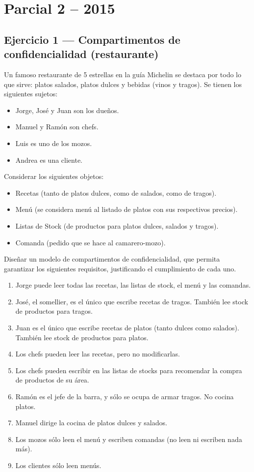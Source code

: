 \section{Parcial 2 -- 2015}

\subsection{Ejercicio 1 — Compartimentos de confidencialidad (restaurante)}

\begin{consigna}
Un famoso restaurante de 5 estrellas en la guía Michelin se destaca por todo lo que sirve: platos salados, platos dulces y bebidas (vinos y tragos). Se tienen los siguientes sujetos:
\begin{itemize}
  \item Jorge, José y Juan son los dueños.
  \item Manuel y Ramón son chefs.
  \item Luis es uno de los mozos.
  \item Andrea es una cliente.
\end{itemize}
Considerar los siguientes objetos:
\begin{itemize}
  \item Recetas (tanto de platos dulces, como de salados, como de tragos).
  \item Menú (se considera menú al listado de platos con sus respectivos precios).
  \item Listas de Stock (de productos para platos dulces, salados y tragos).
  \item Comanda (pedido que se hace al camarero-mozo).
\end{itemize}
Diseñar un modelo de compartimentos de confidencialidad, que permita garantizar los siguientes requisitos, justificando el cumplimiento de cada uno.
\begin{enumerate}
  \item Jorge puede leer todas las recetas, las listas de stock, el menú y las comandas.
  \item José, el somellier, es el único que escribe recetas de tragos. También lee stock de productos para tragos.
  \item Juan es el único que escribe recetas de platos (tanto dulces como salados). También lee stock de productos para platos.
  \item Los chefs pueden leer las recetas, pero no modificarlas.
  \item Los chefs pueden escribir en las listas de stocks para recomendar la compra de productos de su área.
  \item Ramón es el jefe de la barra, y sólo se ocupa de armar tragos. No cocina platos.
  \item Manuel dirige la cocina de platos dulces y salados.
  \item Los mozos sólo leen el menú y escriben comandas (no leen ni escriben nada más).
  \item Los clientes sólo leen menús.
\end{enumerate}
\end{consigna}

